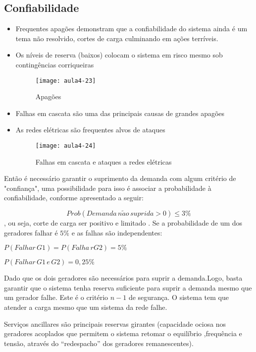 {\subsection{Confiabilidade}
\begin{itemize}
\item Frequentes apagões demonstram que a confiabilidade do sistema ainda é um tema não resolvido, cortes de carga culminando em ações terríveis.
\item Os níveis de reserva (baixos) colocam o sistema em risco mesmo sob
contingências corriqueiras
\begin{figure}[H]
\begin{centering}
\texttt{[image: aula4-23]}\protect\caption{\label{fig:aula4-23} Apagões}
\end{centering}
\end{figure}
\item Falhas em cascata são uma das principais causas de grandes apagões
\item As redes elétricas são frequentes alvos de ataques
\begin{figure}[H]
\begin{centering}
\texttt{[image: aula4-24]}\protect\caption{\label{fig:aula4-24} Falhas em cascata e ataques a redes elétricas }
\end{centering}
\end{figure}
\end{itemize}
Então é necessário garantir o suprimento da demanda com algum critério de "confiança", uma possibilidade para isso é associar a probabilidade à confiabilidade, conforme apresentado a seguir:

$$Prob(Demanda \, n\tilde{a}o \, suprida>0)\leq3\%$$,
ou seja, corte de carga ser positivo e limitado
.
Se a probabilidade de um dos geradores falhar é $5\%$ e as falhas
são independentes:

$P(Falhar\,G1)=P(Falha\,rG2)=5\%$

$P(Falhar\,G1\,e\,G2)=0,25\%$

Dado que os dois geradores são necessários para suprir a demanda.Logo, basta garantir que o sistema tenha reserva suficiente para suprir a demanda mesmo que um gerador falhe. Este é o critério $n-1$ de segurança. O sistema tem que atender a carga mesmo que um sistema da rede falhe.

Serviços ancillares são principais reservas girantes (capacidade ociosa nos geradores acoplados que permitem o sistema retomar o equilíbrio ,frequência e tensão, através do ``redespacho'' dos geradores remanescentes).

}
